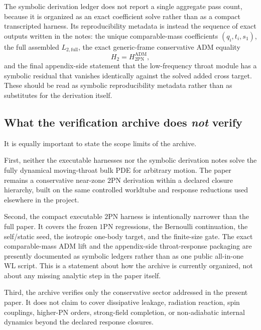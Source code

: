 \documentclass[11pt]{article}
\newcommand{\OnePN}{\mathrm{1PN}}
\newcommand{\TwoPN}{\mathrm{2PN}}
\newcommand{\ADM}{\mathrm{ADM}}
\begin{document}
The symbolic derivation ledger does not report a single aggregate pass count, because it is
organized as an exact coefficient solve rather than as a compact transcripted harness.
Its reproducibility metadata is instead the sequence of exact outputs written in the notes:
the unique comparable-mass coefficients \((q_i,t_i,s_1)\), the full assembled
\(L_{2,\mathrm{full}}\), the exact generic-frame conservative \(\ADM\) equality
\begin{equation}
H_2=H^{\ADM}_{2\mathrm{PN}},
\label{eq:verification-adm-zero}
\end{equation}
and the final appendix-side statement that the low-frequency throat module has a symbolic
residual that vanishes identically against the solved added cross target.
These should be read as symbolic reproducibility metadata rather than as substitutes for
the derivation itself.

\subsection{What the verification archive does \emph{not} verify}
\label{sec:verification-scope}

It is equally important to state the scope limits of the archive.

First, neither the executable harnesses nor the symbolic derivation notes solve the fully
dynamical moving-throat bulk PDE for arbitrary motion.
The paper remains a conservative near-zone \(\TwoPN\) derivation within a declared closure
hierarchy, built on the same controlled worldtube and response reductions used elsewhere
in the project.

Second, the compact executable \(\TwoPN\) harness is intentionally narrower than the full
paper.
It covers the frozen \(\OnePN\) regressions, the Bernoulli continuation, the self/static
seed, the isotropic one-body target, and the finite-size gate.
The exact comparable-mass \(\ADM\) lift and the appendix-side throat-response packaging
are presently documented as symbolic ledgers rather than as one public all-in-one WL
script.
This is a statement about how the archive is currently organized, not about any missing
analytic step in the paper itself.

Third, the archive verifies only the conservative sector addressed in the present paper.
It does not claim to cover dissipative leakage, radiation reaction, spin couplings,
higher-PN orders, strong-field completion, or non-adiabatic internal dynamics beyond the
declared response closures.
\end{document}
